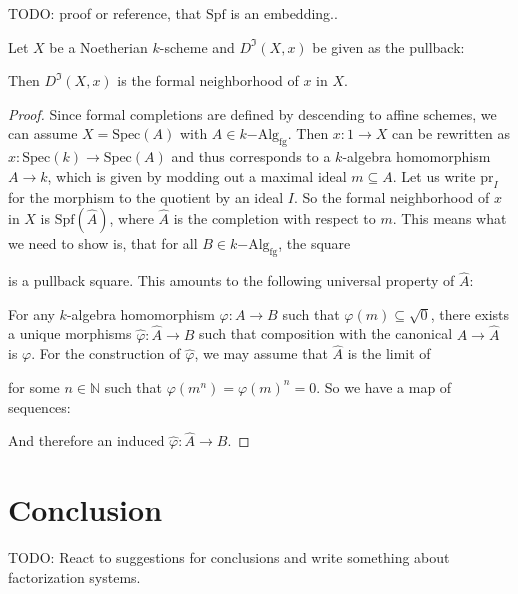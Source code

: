 \documentclass[9pt,twosided]{amsart}
\newcommand{\bN}{\mathbb N}
\newcommand{\Spec}{\ensuremath{\mathrm{Spec}}}
\newcommand{\Spf}{\ensuremath{\mathrm{Spf}}}
\newcommand{\fgkAlg}{\ensuremath{k\mathrm{-Alg}_{\mathrm{fg}}}}
\newcommand{\fgkAlgTop}{\ensuremath{k\mathrm{-Alg}_{\mathrm{fg,top}}}}
\newcommand{\todo}[1]{{\color{red}TODO: #1 \\}}
\begin{document}
\todo{proof or reference, that $\Spf$ is an embedding..}
\begin{rmk}
  Let $X$ be a Noetherian $k$-scheme and $D^\Im(X,x)$ be given as the pullback:
  \begin{center}
  \end{center}
  Then $D^\Im(X,x)$ is the formal neighborhood of $x$ in $X$. 
\end{rmk}
\begin{proof}
  Since formal completions are defined by descending to affine schemes, we can assume $X=\Spec(A)$ with $A\in\fgkAlg$.
  Then $x:1\to X$ can be rewritten as $x:\Spec(k)\to\Spec(A)$ and thus corresponds to a $k$-algebra homomorphism $A\to k$,
  which is given by modding out a maximal ideal $m\subseteq A$. Let us write $\mathrm{pr}_I$ for the morphism to the quotient by an ideal $I$.
  So the formal neighborhood of $x$ in $X$ is $\Spf(\hat{A})$, where $\hat{A}$ is the completion with respect to $m$.
  This means what we need to show is, that for all $B\in\fgkAlg$, the square
  \begin{center}
  \end{center}
  is a pullback square. This amounts to the following universal property of $\hat{A}$:

  For any $k$-algebra homomorphism $\varphi:A\to B$ such that $\varphi(m)\subseteq \sqrt{0}$, there exists a unique morphisms
  $\hat{\varphi}:\hat{A}\to B$ such that composition with the canonical $A\to\hat{A}$ is $\varphi$.
  For the construction of $\hat{\varphi}$, we may assume that $\hat{A}$ is the limit of
  \begin{center}
  \end{center}
  for some $n\in\bN$ such that $\varphi(m^n)=\varphi(m)^n={0}$. So we have a map of sequences:
  \begin{center}
  \end{center}
  And therefore an induced $\hat{\varphi}:\hat{A}\to B$.
\end{proof}

\section{Conclusion}
\todo{React to suggestions for conclusions and write something about factorization systems.}

\printbibliography
\end{document}
